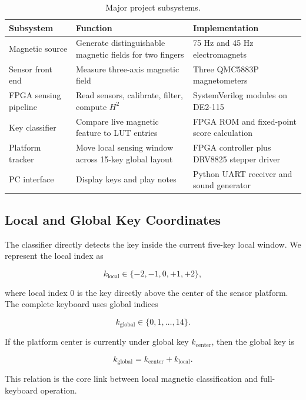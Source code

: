 \begin{table}[H]
    \centering
    \caption{Major project subsystems.}
    \label{tab:major_subsystems}
    \renewcommand{\arraystretch}{1.2}
    \begin{tabularx}{0.96\textwidth}{p{3.2cm} X p{3.2cm}}
        \toprule
        \textbf{Subsystem} & \textbf{Function} & \textbf{Implementation} \\
        \midrule
        Magnetic source & Generate distinguishable magnetic fields for two fingers & 75 Hz and 45 Hz electromagnets \\
        Sensor front end & Measure three-axis magnetic field & Three QMC5883P magnetometers \\
        FPGA sensing pipeline & Read sensors, calibrate, filter, compute $H^2$ & SystemVerilog modules on DE2-115 \\
        Key classifier & Compare live magnetic feature to LUT entries & FPGA ROM and fixed-point score calculation \\
        Platform tracker & Move local sensing window across 15-key global layout & FPGA controller plus DRV8825 stepper driver \\
        PC interface & Display keys and play notes & Python UART receiver and sound generator \\
        \bottomrule
    \end{tabularx}
\end{table}

\subsection{Local and Global Key Coordinates}

The classifier directly detects the key inside the current five-key local window. We represent the local index as

\begin{equation}
    k_{\mathrm{local}} \in \{-2,-1,0,+1,+2\},
\end{equation}

where local index 0 is the key directly above the center of the sensor platform. The complete keyboard uses global indices

\begin{equation}
    k_{\mathrm{global}} \in \{0,1,\ldots,14\}.
\end{equation}

If the platform center is currently under global key $k_{\mathrm{center}}$, then the global key is

\begin{equation}
    k_{\mathrm{global}} = k_{\mathrm{center}} + k_{\mathrm{local}}.
    \label{eq:local_global}
\end{equation}

This relation is the core link between local magnetic classification and full-keyboard operation.
